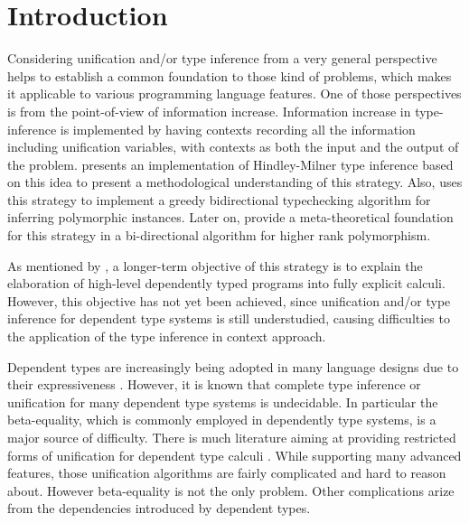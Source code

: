 \section{Introduction}

Considering unification and/or type inference from a very general perspective
helps to establish a common foundation to those kind of problems, which makes it
applicable to various programming language features. One of those
perspectives is from the point-of-view of information 
increase. Information increase in type-inference is implemented by having contexts recording all the
information including unification variables, with contexts as both the input and
the output of the problem. \citet{gundry2010type} presents an implementation of
Hindley-Milner \citep{damas1982principal,hindley69principal} type inference
based on this idea to present a methodological understanding of this strategy.
Also, \citet{dunfield2009greedy} uses this strategy to implement a greedy
bidirectional typechecking algorithm for inferring polymorphic instances. Later
on, \citet{dunfield2013complete} provide a meta-theoretical 
foundation for this strategy in a
bi-directional algorithm for higher rank polymorphism.

As mentioned by \citet{gundry2010type}, a longer-term objective of this strategy
is to explain the elaboration of high-level dependently typed programs into
fully explicit calculi. However, this objective has not yet been
achieved, since unification and/or type inference
for dependent type systems is still understudied, causing difficulties
to the application of the type inference in context approach.

Dependent types are increasingly being adopted in many language designs due
to their expressiveness \citep{xi1999dependent, licata2005formulation,
  pasalic2006concoqtion, mckinna2006dependent, norell2009dependently,
  brady2013idris}. However, it is known that complete type inference or
unification for many dependent type systems is undecidable. In
particular the beta-equality, which is commonly employed in
dependently type systems, is a major source of difficulty.
There is
much literature aiming at providing restricted forms of unification for
dependent type calculi \citep{ziliani2015unification, abel2011higher,
  elliott1989higher}. While supporting many advanced features, those unification
algorithms are fairly complicated and hard to reason about.
However beta-equality is not the only problem. Other complications
arize from the dependencies introduced by dependent types.

